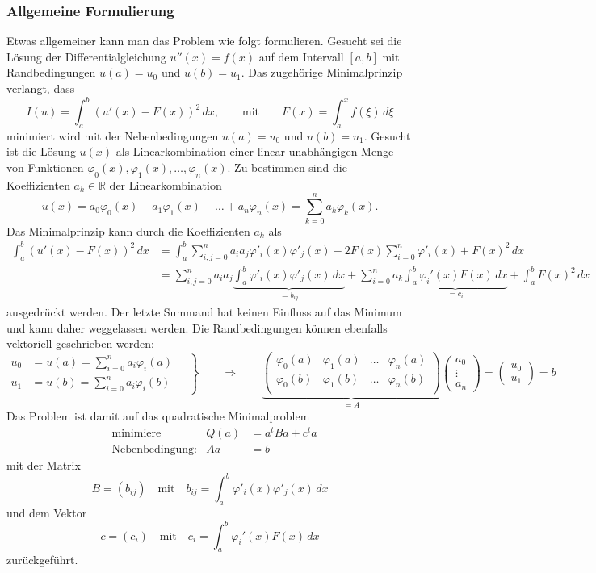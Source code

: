 \subsubsection{Allgemeine Formulierung}
Etwas allgemeiner kann man das Problem wie folgt formulieren.
Gesucht sei die Lösung der Differentialgleichung $u''(x)=f(x)$ auf
dem Intervall $[a,b]$ mit Randbedingungen $u(a)=u_0$ und $u(b)=u_1$.
Das zugehörige Minimalprinzip verlangt, dass
\[
I(u) = \int_a^b (u'(x) - F(x))^2\,dx,
\qquad \text{mit}\qquad F(x) = \int_a^x f(\xi)\,d\xi
\]
minimiert wird mit der Nebenbedingungen $u(a)=u_0$ und $u(b)=u_1$.
Gesucht ist die Lösung $u(x)$ als Linearkombination einer linear
unabhängigen Menge von Funktionen
$\varphi_0(x),\varphi_1(x),\dots,\varphi_n(x)$.
Zu bestimmen sind die Koeffizienten $a_k\in\mathbb R$ der Linearkombination
\[
u(x) = a_0\varphi_0(x) + a_1\varphi_1(x) + \dots + a_n\varphi_n(x)
=
\sum_{k=0}^n a_k\varphi_k(x).
\]
Das Minimalprinzip kann durch die Koeffizienten $a_k$ als
\begin{align*}
\int_a^b (u'(x)-F(x))^2 \,dx
&=
\int_a^b 
\sum_{i,j=0}^n
a_ia_j
\varphi'_i(x)\varphi'_j(x) 
-2F(x)
\sum_{i=0}^n \varphi'_i(x)
+
F(x)^2
\,dx
\\
&=
\sum_{i,j=0}^n a_ia_j
\underbrace{\int_a^b \varphi'_i(x)\varphi'_j(x)\,dx}_{\displaystyle=b_{ij}}
+
\sum_{i=0}^n a_k \underbrace{\int_a^b \varphi_i'(x)F(x)\,dx }_{\displaystyle=c_i}
+
\int_a^b F(x)^2\,dx
\end{align*}
ausgedrückt werden.
Der letzte Summand hat keinen Einfluss auf das Minimum und kann daher
weggelassen werden.
Die Randbedingungen können ebenfalls vektoriell geschrieben werden:
\[
\left.
\begin{aligned}
u_0&=u(a) = \sum_{i=0}^n a_i\varphi_i(a) \\
u_1&=u(b) = \sum_{i=0}^n a_i\varphi_i(b)
\end{aligned}
\quad
\right\}
\qquad\Rightarrow\qquad
\underbrace{\begin{pmatrix}
\varphi_0(a)& \varphi_1(a) & \dots & \varphi_n(a) \\
\varphi_0(b)& \varphi_1(b) & \dots & \varphi_n(b) \\
\end{pmatrix}}_{\displaystyle =A}
\begin{pmatrix}a_0\\\vdots\\a_n\end{pmatrix}
=
\begin{pmatrix}
u_0\\u_1
\end{pmatrix} = b
\]
Das Problem ist damit auf das quadratische Minimalproblem
%
\[
\begin{aligned}
&\text{minimiere}&
Q(a) &= a^tBa + c^ta 
\\
&\text{Nebenbedingung:}&
Aa&=b
\end{aligned}
\]
mit der Matrix
\[
B=(b_{ij})
\quad\text{mit}\quad
b_{ij}
= 
\int_a^b \varphi'_i(x)\varphi'_j(x)\,dx
\]
und dem Vektor
\[
c=(c_i)
\quad
\text{mit}\quad
c_i
=
\int_a^b \varphi_i'(x) F(x)\,dx
\]
zurückgeführt.

